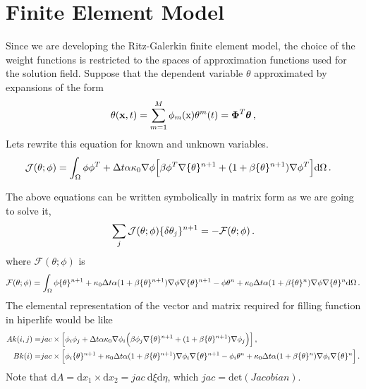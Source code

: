 \documentclass[]{article}
\begin{document}
\section{Finite Element Model} \label{sec: fem}
Since we are developing the Ritz-Galerkin finite element model, the choice of the weight functions is restricted to the spaces of approximation functions used for the solution field. Suppose that the dependent variable $\theta$ approximated by expansions of the form
\begin{equation}\label{eq16}
	\begin{aligned}
		\theta(\mathbf{x}, t)= \sum_{m=1}^{M} \phi_m(\mathrm{x}) \mathbf{\theta}^m(t) = \boldsymbol{\Phi}^T\boldsymbol{\theta} \thinspace,
	\end{aligned}
\end{equation}
Lets rewrite this equation for known and unknown variables.
\begin{equation}\label{eq17}
	\begin{aligned}
		\mathcal{J}(\theta;\phi)&= \int_{\Omega} \phi \phi^T + \Delta t \alpha \kappa_0 \nabla \phi \Big[\beta \phi^T \nabla \{\theta\} ^{n+1} + (1+\beta \{\theta\}^{n+1}) \nabla \phi^T\Big]\mathrm{d} \Omega\thinspace.
	\end{aligned}
\end{equation}

The above equations can be written symbolically in matrix form as we are going to solve it, 
\begin{equation}\label{eq18}
	\begin{aligned}
		\sum_j \mathcal{J}(\theta;\phi)\{\delta \theta_j\}^{n+1} = -\mathcal{F}(\theta;\phi)\thinspace.
	\end{aligned}
\end{equation}
where $\mathcal{F}(\theta;\phi)$ is
\begin{equation}\label{eq19}
	\begin{aligned}
		\mathcal{F}(\theta;\phi)= \int_{\Omega} \phi \{\theta\}^{n+1} + \kappa_0 \Delta t \alpha (1+\beta \{\theta\}^{n+1})\nabla \phi \nabla \{\theta\}^{n+1} - \phi \theta^{n} + \kappa_0 \Delta t \alpha (1+\beta \{\theta\}^{n})\nabla \phi \nabla \{\theta\}^{n}\mathrm{d} \Omega\thinspace.
	\end{aligned}
\end{equation}
The elemental representation of the vector and matrix required for filling function in hiperlife would be like
\begin{equation}\label{eq20}
	\begin{aligned}[b]
		Ak (i,j) =& jac \times \Big[\phi_i \phi_j + \Delta t \alpha \kappa_0 \nabla \phi_i \Big(\beta \phi_j \nabla \{\theta\} ^{n+1} + (1+\beta \{\theta\}^{n+1}) \nabla \phi_j\Big)\Big]\thinspace, \\
		Bk (i) =& jac \times \Big[\phi_i \{\theta\}^{n+1} + \kappa_0 \Delta t \alpha (1+\beta \{\theta\}^{n+1})\nabla \phi_i \nabla \{\theta\}^{n+1} - \phi_i \theta^{n} + \kappa_0 \Delta t \alpha (1+\beta \{\theta\}^{n})\nabla \phi_i \nabla \{\theta\}^{n}\Big]\thinspace.
	\end{aligned}
\end{equation}
Note that $\mathrm{d}A=\mathrm{d}x_{1} \times \mathrm{d}x_{2}=jac \ \mathrm{d}\xi \mathrm{d}\eta$, which $jac=\mathrm{det}(Jacobian)$.
\end{document}
